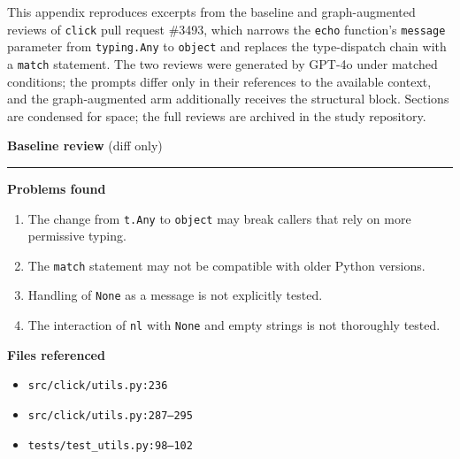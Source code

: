\label{app:review-example}

This appendix reproduces excerpts from the baseline and graph-augmented
reviews of \texttt{click} pull request \#3493, which narrows the
\texttt{echo} function's \texttt{message} parameter from
\texttt{typing.Any} to \texttt{object} and replaces the type-dispatch
chain with a \texttt{match} statement.  The two reviews were generated by
GPT-4o under matched conditions; the prompts differ only in their
references to the available context, and the graph-augmented arm
additionally receives the structural block.
Sections are condensed for space; the full reviews are archived in the
study repository.

\bigskip

\noindent
\begin{minipage}[t]{0.48\textwidth}
\noindent\textbf{Baseline review} (diff only)\par
\smallskip\hrule\smallskip
{\small
\textbf{Problems found}
\begin{enumerate}[leftmargin=*,itemsep=2pt]
\item The change from \texttt{t.Any} to \texttt{object} may break callers
      that rely on more permissive typing.
\item The \texttt{match} statement may not be compatible with older Python
      versions.
\item Handling of \texttt{None} as a message is not explicitly tested.
\item The interaction of \texttt{nl} with \texttt{None} and empty strings
      is not thoroughly tested.
\end{enumerate}

\textbf{Files referenced}
\begin{itemize}[leftmargin=*,itemsep=1pt]
\item \texttt{src/click/utils.py:236}
\item \texttt{src/click/utils.py:287--295}
\item \texttt{tests/test\_utils.py:98--102}
\end{itemize}
}
\end{minipage}%
\hfill
